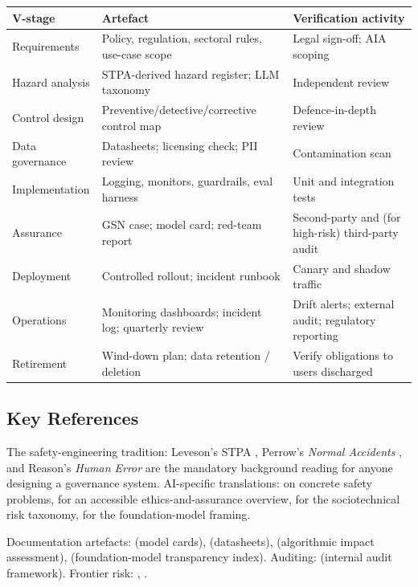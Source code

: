 \begin{center}
\small
\begin{tabular}{p{4.3cm}|p{4.3cm}|p{4.3cm}}
\textbf{V-stage} & \textbf{Artefact} & \textbf{Verification activity}\\\hline
Requirements & Policy, regulation, sectoral rules, use-case scope & Legal sign-off; AIA scoping \\
Hazard analysis & STPA-derived hazard register; LLM taxonomy & Independent review \\
Control design & Preventive/detective/corrective control map & Defence-in-depth review \\
Data governance & Datasheets; licensing check; PII review & Contamination scan \\
Implementation & Logging, monitors, guardrails, eval harness & Unit and integration tests \\
Assurance & GSN case; model card; red-team report & Second-party and (for high-risk) third-party audit \\
Deployment & Controlled rollout; incident runbook & Canary and shadow traffic \\
Operations & Monitoring dashboards; incident log; quarterly review & Drift alerts; external audit; regulatory reporting \\
Retirement & Wind-down plan; data retention / deletion & Verify obligations to users discharged \\
\end{tabular}
\end{center}

\subsection{Key References}

The safety-engineering tradition: Leveson's STPA
\citep{leveson2011engineering}, Perrow's \emph{Normal Accidents}
\citep{perrow1999normal}, and Reason's \emph{Human Error}
\citep{reason1990human} are the mandatory background reading
for anyone designing a governance system. AI-specific
translations: \citet{amodei2016concrete} on concrete safety
problems, \citet{leslie2021understanding} for an accessible
ethics-and-assurance overview, \citet{weidinger2021ethical,
weidinger2023sociotechnical} for the sociotechnical risk
taxonomy, \citet{bommasani2021opportunities} for the
foundation-model framing.

Documentation artefacts: \citet{mitchell2019modelcards} (model
cards), \citet{gebru2021datasheets} (datasheets),
\citet{metcalf2021algorithmic} (algorithmic impact assessment),
\citet{bommasani2023transparency} (foundation-model transparency
index). Auditing: \citet{raji2020closing} (internal audit
framework). Frontier risk: \citet{shevlane2023model},
\citet{anderljung2023frontier}.

